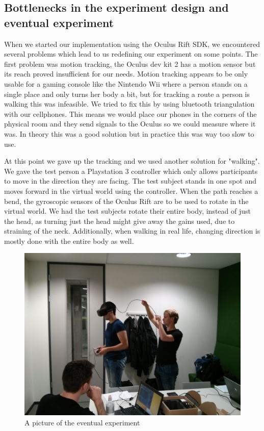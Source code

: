 \subsection{Bottlenecks in the experiment design and eventual experiment}
When we started our implementation using the Oculus Rift SDK, we encountered several problems which lead to us redefining our experiment on some points. 
The first problem was motion tracking, the Oculus dev kit 2 has a motion sensor but its reach proved insufficient for our needs.
Motion tracking appears to be only usable for a gaming console like the Nintendo Wii where a person stands on a single place and only turns her body a bit, but for tracking a route a person is walking this was infeasible. 
We tried to fix this by using bluetooth triangulation with our cellphones. 
This means we would place our phones in the corners of the physical room and they send signals to the Oculus so we could measure where it was. 
In theory this was a good solution but in practice this was way too slow to use. 

At this point we gave up the tracking and we used another solution for "walking". 
We gave the test person a Playstation 3 controller which only allows participants to move in the direction they are facing.
The test subject stands in one spot and moves forward in the virtual world using the controller.
When the path reaches a bend, the gyroscopic sensors of the Oculus Rift are to be used to rotate in the virtual world.
We had the test subjects rotate their entire body, instead of just the head, as turning just the head might give away the gains used, due to straining of the neck.
Additionally, when walking in real life, changing direction is mostly done with the entire body as well.

\begin{figure}[htb]
	\centering
	\includegraphics[width=\linewidth]{sections/finalreport/images/experiment.jpg}	
	\caption{A picture of the eventual experiment}
\end{figure}

